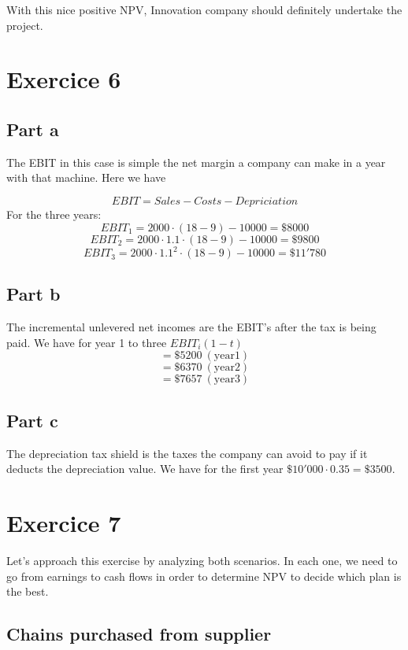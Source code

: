 \documentclass[a4paper,11pt,twoside]{article}
\def \be {\begin{equation}}
\def \ee {\end{equation}}
\begin{document}
With this nice positive NPV, Innovation company should definitely undertake the project. 


\section*{Exercice 6}

\subsection*{Part a}
The EBIT in this case is simple the net margin a company can make in a year with that machine. Here we have

\be
EBIT = Sales - Costs - Depriciation
\ee
For the three years:
\be
EBIT_1 = 2000\cdot (18-9) - 10000 = \$8000
\ee
\be
EBIT_2 = 2000\cdot1.1\cdot (18-9)  - 10000 = \$9800
\ee
\be
EBIT_3 = 2000\cdot1.1^2\cdot(18-9) - 10000 = \$11'780
\ee

\subsection*{Part b}

The incremental unlevered net incomes are the EBIT's after the tax is being paid. We have for year 1 to three $EBIT_i(1-t)$ 
\be
= \$5200 \mathrm{\ (year 1)}
\ee
\be
= \$6370 \mathrm{\ (year 2)}
\ee
\be
= \$7657 \mathrm{\ (year 3)}
\ee

\subsection*{Part c}

The depreciation tax shield is the taxes the company can avoid to pay if it deducts the depreciation value. We have for the first year $\$10'000\cdot 0.35=\$3500$.



\section*{Exercice 7}

Let's approach this exercise by analyzing both scenarios. In each one, we need to go from earnings to cash flows in order to determine NPV to decide which plan is the best. 


\subsection*{Chains purchased from supplier}
\end{document}
